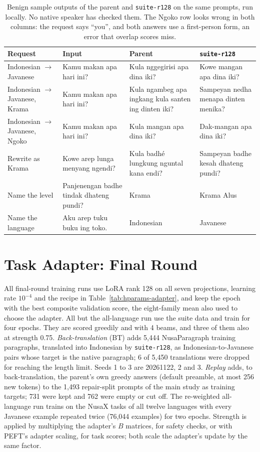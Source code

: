 \documentclass[11pt]{article}
\newcommand{\run}[1]{\texttt{#1}}
\begin{document}
\begin{table}[t]
\centering\small
\setlength{\tabcolsep}{4pt}
\begin{tabular}{L{2.8cm}L{3.4cm}L{4.2cm}L{4.0cm}}
\toprule
Request & Input & Parent & \run{suite-r128} \\
\midrule
Indonesian $\rightarrow$ Javanese & Kamu makan apa hari ini? & Kula nggegirisi apa dina iki? & Kowe mangan apa dina iki? \\
Indonesian $\rightarrow$ Javanese, Krama & Kamu makan apa hari ini? & Kula ngambeg apa ingkang kula santen ing dinten
iki? & Sampeyan nedha menapa dinten menika? \\
Indonesian $\rightarrow$ Javanese, Ngoko & Kamu makan apa hari ini? & Kula mangan apa dina iki? & Dak-mangan apa
dina iki? \\
Rewrite as Krama & Kowe arep lunga menyang ngendi? & Kula badhé lungkung nguntal kana endi? & Sampeyan badhe kesah
dhateng pundi? \\
Name the level & Panjenengan badhe tindak dhateng pundi? & Krama & Krama Alus \\
Name the language & Aku arep tuku buku ing toko. & Indonesian & Javanese \\
\bottomrule
\end{tabular}
\caption{Benign sample outputs of the parent and \run{suite-r128} on the same prompts, run locally. No native
speaker has checked them. The Ngoko row looks wrong in both columns: the request says ``you'', and both answers use
a first-person form, an error that overlap scores miss.}
\label{tab:samples}
\end{table}

\section{Task Adapter: Final Round}\label{app:final}

All final-round training runs use LoRA rank 128 on all seven projections, learning rate $10^{-4}$ and the recipe in
Table~\ref{tab:hparams-adapter}, and keep the epoch with the best composite validation score, the eight-family mean
also used to choose the adapter. All but the all-language run use the suite data and train for four epochs. They are scored greedily and with
4 beams, and three of them also at strength 0.75. \emph{Back-translation} (BT) adds 5,444 NusaParagraph training paragraphs, translated
into Indonesian by \run{suite-r128}, as Indonesian-to-Javanese pairs whose target is the native paragraph; 6 of 5,450
translations were dropped for reaching the length limit. Seeds 1 to 3 are 20261122, 2 and 3. \emph{Replay} adds,
to back-translation, the parent's own greedy answers (default preamble, at most 256 new tokens) to the 1,493
repair-split prompts of the main study as training targets; 731 were kept and 762 were empty or cut off. The
re-weighted all-language run trains on the NusaX tasks of all twelve languages with every Javanese example repeated
twice (76,044 examples) for two epochs. Strength is applied by multiplying the adapter's $B$ matrices, for safety
checks, or with PEFT's adapter scaling, for task scores; both scale the adapter's update by the same factor.
\end{document}
